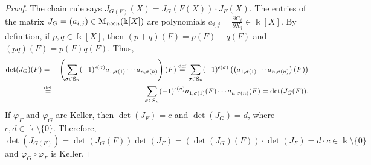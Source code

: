 \documentclass[11pt,reqno]{amsart}
\theoremstyle{definition}
\newcommand{\mbk}{\mbox{$\Bbbk$}}
\begin{document}
\begin{proof}
The chain rule says $J_{G(F)}(X)=J_G(F(X))\cdot J_F(X)$. The entries of the matrix
$J_G=(a_{i,j})\in{\rm M}_{n\times n}(\mbk[X])$ are polynomials
$a_{i,j}=\tfrac{\partial G_i}{\partial X_j}\in\mbk[X]$. 
By definition, if $p,q\in\mbk[X]$, then $(p+q)(F)=p(F)+q(F)$ and $(pq)(F)=p(F)q(F)$. Thus, 
\begin{eqnarray*}
\det(J_G)(F)&=&
\left(\sum_{\sigma\in {\rm S}_n}(-1)^{\epsilon(\sigma)}a_{1,\sigma(1)}\cdots a_{n,\sigma(n)}\right)(F)
\stackrel{\rm def}{=}\sum_{\sigma\in {\rm S}_n}(-1)^{\epsilon(\sigma)}\left(\left(a_{1,\sigma(1)}\cdots a_{n,\sigma(n)}\right)(F)\right)\\&\stackrel{\rm def}{=}&
\sum_{\sigma\in {\rm S}_n}(-1)^{\epsilon(\sigma)}a_{1,\sigma(1)}(F)\cdots a_{n,\sigma(n)}(F)=
\det(J_G(F)).
\end{eqnarray*}
If $\varphi_F$ and $\varphi_G$ are Keller, then $\det(J_F)=c$ and $\det(J_G)=d$, where $c,d\in\mbk\setminus\{0\}$. Therefore, $\det(J_{G(F)})=\det(J_G(F))\det(J_F)
=(\det(J_G)(F))\cdot\det(J_F)=d\cdot c\in\mbk\setminus\{0\}$ and
$\varphi_G\circ\varphi_F$ is Keller.
\end{proof}
\end{document}
